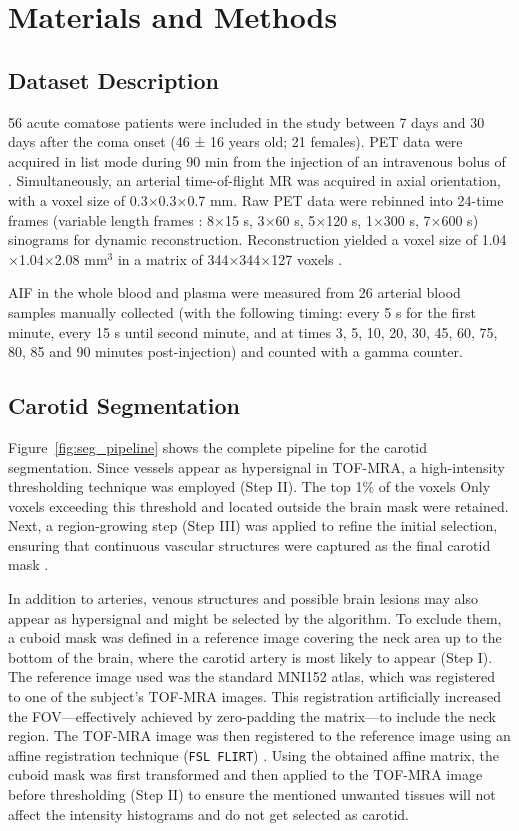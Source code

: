 \chapter{Materials and Methods}

\section{Dataset Description}
56 acute comatose patients were included in the study between 7 days and 30 days after the coma onset (46 ± 16 years old; 21 females).
PET data were acquired in list mode during 90 min from the injection of an intravenous bolus of \fdg.
Simultaneously, an arterial time-of-flight MR was acquired in axial orientation, with a voxel size of 0.3$\times$0.3$\times$0.7 mm.
Raw PET data were rebinned into 24-time frames (variable length frames : 8$\times$15 s, 3$\times$60 s, 5$\times$120 s, 1$\times$300 s, 7$\times$600 s) sinograms for dynamic reconstruction.
Reconstruction yielded a voxel size of 1.04$\times$1.04$\times$2.08 mm$^3$ in a matrix of 344$\times$344$\times$127 voxels .

AIF in the whole blood and plasma were measured from 26 arterial blood samples manually collected (with the following timing: every 5 s for the first minute, every 15 s until second minute, and at times 3, 5, 10, 20, 30, 45, 60, 75, 80, 85 and 90 minutes post-injection) and counted with a gamma counter.

\section{Carotid Segmentation\label{sec:carotid}}
Figure~\ref{fig:seg_pipeline} shows the complete pipeline for the carotid segmentation.
Since vessels appear as hypersignal in TOF-MRA, a high-intensity thresholding technique was employed (Step II).
The top 1\% of the voxels 
Only voxels exceeding this threshold and located outside the brain mask were retained.
Next, a region-growing step (Step III) was applied to refine the initial selection, ensuring that continuous vascular structures were captured as the final carotid mask \cite{irace2021bayesian}.

In addition to arteries, venous structures and possible brain lesions may also appear as hypersignal and might be selected by the algorithm.
To exclude them, a cuboid mask was defined in a reference image covering the neck area up to the bottom of the brain, where the carotid artery is most likely to appear (Step I).
The reference image used was the standard MNI152 atlas, which was registered to one of the subject's TOF-MRA images.
This registration artificially increased the FOV---effectively achieved by zero-padding the matrix---to include the neck region.
The TOF-MRA image was then registered to the reference image using an affine registration technique (\texttt{\small FSL FLIRT}) \cite{jenkinson2012fsl}.
Using the obtained affine matrix, the cuboid mask was first transformed and then applied to the TOF-MRA image before thresholding (Step II) to ensure the mentioned unwanted tissues will not affect the intensity histograms and do not get selected as carotid.

